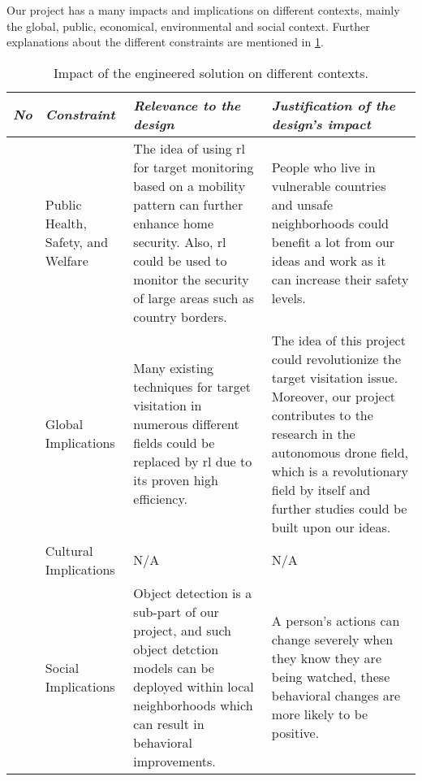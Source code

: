 \documentclass[../main.tex]{subfiles}
\begin{document}
\setcounter{impactcounter}{1}
\newcommand\showimpactcounter{%
    \theimpactcounter\stepcounter{impactcounter}%
}

Our project has a many impacts and implications on different contexts, mainly 
the global, public, economical, environmental and social context. Further 
explanations about the different constraints are mentioned in 
\cref{tab:impact}.

\begin{table}[H]
    \centering
    \caption{Impact of the engineered solution on 
    different contexts.}
    \label{tab:impact}
 \begin{tabularx}{\textwidth}{ c p{2.5cm} X X }
	\toprule
	\textit{No} 
	& \textit{Constraint} 
	& \textit{Relevance to the design} 
	& \textit{Justification of the design’s impact} \\
	
	\midrule
	
	\showimpactcounter
	& Public Health, Safety, and Welfare
	& The idea of using \gls{rl} for target monitoring based on a mobility 
	pattern can further enhance home security. Also, \gls{rl} could be used to 
	monitor the security of large areas such as country borders.
	& People who live in vulnerable countries and unsafe neighborhoods could
	benefit a lot from our ideas and work as it can increase their safety 
	levels. \\
	
	\showimpactcounter
	& Global Implications
	& Many existing techniques for target visitation in numerous different 
	fields could be replaced by \gls{rl} due to its proven high efficiency. 
	& The idea of this project could revolutionize the target 
	visitation issue. Moreover, our project contributes to the 
	research in the autonomous drone field, which is a revolutionary field 
	by itself and further studies could be built upon our ideas. \\
	
	
	\showimpactcounter
	& Cultural Implications 
	& N/A
	& N/A \\
	
	\showimpactcounter
	& Social Implications
	& Object detection is a sub-part of our project, and such object detction 
	models can be deployed within local neighborhoods which can result in 
	behavioral improvements.
	& A person's actions can change severely when they know they are being 
	watched, these behavioral changes are more likely to be positive. \\ 
	

\end{tabularx}
\end{table}
\end{document}
